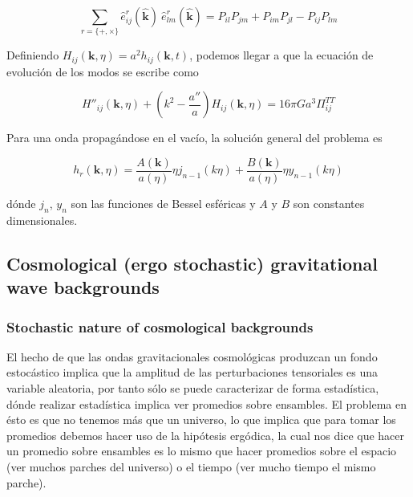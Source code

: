 \begin{equation}
    \sum_{r = \{ +, \times \}} \hat{e}^r_{ij} \left( \hat{\textbf{k}} \right) \ \hat{e}^r_{lm} \left( \hat{\textbf{k}} \right) = P_{il} P_{jm} + P_{im} P_{jl} - P_{ij} P_{lm}
\end{equation}

Definiendo $H_{ij} \left( \textbf{k}, \eta \right) = a^2 h_{ij} \left( \textbf{k}, t \right)$, podemos llegar a que la ecuación de evolución de los modos se escribe como 

\begin{equation}
    H''_{ij} (\textbf{k}, \eta) + \left(k^2 - \frac{a''}{a} \right) H_{ij} (\textbf{k}, \eta) = 16 \pi G a^3 \Pi^{TT}_{ij}
\end{equation}

Para una onda propagándose en el vacío, la solución general del problema es

\begin{equation}
    h_{r} \left( \textbf{k}, \eta \right) = \frac{A (\textbf{k})}{a (\eta)} \eta j_{n-1} (k \eta) + \frac{B \left( \textbf{k} \right)}{a (\eta)} \eta y_{n-1} (k \eta)
\end{equation}

\noindent
dónde $j_{n}$, $y_n$ son las funciones de Bessel esféricas y $A$ y $B$ son constantes dimensionales.

\subsection{Cosmological (ergo stochastic) gravitational wave backgrounds}

\subsubsection{Stochastic nature of cosmological backgrounds}

El hecho de que las ondas gravitacionales cosmológicas produzcan un fondo estocástico implica que la amplitud de las perturbaciones tensoriales es una variable aleatoria, por tanto sólo se puede caracterizar de forma estadística, dónde realizar estadística implica ver promedios sobre ensambles. El problema en ésto es que no tenemos más que un universo, lo que implica que para tomar los promedios debemos hacer uso de la hipótesis ergódica, la cual nos dice que hacer un promedio sobre ensambles es lo mismo que hacer promedios sobre el espacio (ver muchos parches del universo) o el tiempo (ver mucho tiempo el mismo parche).

